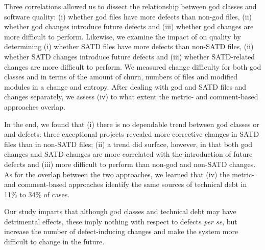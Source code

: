 Three correlations allowed us to dissect the relationship between god classes and software quality: (i) whether god files have more defects than non-god files, (ii) whether god changes introduce future defects and (iii) whether god changes are more difficult to perform. Likewise, we examine the impact of \SATD on quality by determining (i) whether SATD files have more defects than non-SATD files, (ii) whether SATD changes introduce future defects and (iii) whether SATD-related changes are more difficult to perform. We measured change difficulty for both god classes and \SATD in terms of the amount of churn, numbers of files and modified modules in a change and entropy. After dealing with god and SATD files and changes separately, we assess (iv) to what extent the metric- and comment-based approaches overlap.


In the end, we found that (i) there is no dependable trend between god classes or \SATD and defects: three exceptional projects revealed more corrective changes in SATD files than in non-SATD files; (ii) a trend did surface, however, in that both god changes and SATD changes are more correlated with the introduction of future defects and (iii) more difficult to perform than non-god and non-SATD changes. As for the overlap between the two approaches, we learned that (iv) the metric- and comment-based approaches identify the same sources of technical debt in 11\% to 34\% of cases.

Our study imparts that although god classes and technical debt may have detrimental effects, these imply nothing with respect to defects \textit{per se}, but increase the number of defect-inducing changes and make the system more difficult to change in the future. 